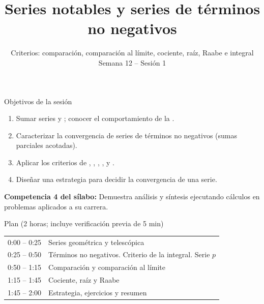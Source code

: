 \documentclass[10pt,aspectratio=169]{beamer}
\title[Series y criterios de convergencia]{Series notables y series de términos no negativos}
\subtitle{Criterios: comparación, comparación al límite, cociente, raíz, Raabe e integral\\[2pt]\small Semana 12 -- Sesión 1}
\begin{document}
\begin{frame}
  \titlepage
\end{frame}

\begin{frame}{Objetivos de la sesión}
  \begin{enumerate}
    \item Sumar series  y ; conocer el comportamiento de la .
    \item Caracterizar la convergencia de series de términos no negativos (sumas parciales acotadas).
    \item Aplicar los criterios de , , ,
      ,  y .
    \item Diseñar una estrategia para decidir la convergencia de una serie.
  \end{enumerate}
  \vspace{1mm}
  {\small\textbf{Competencia 4 del sílabo:} Demuestra análisis y síntesis ejecutando cálculos en problemas aplicados a su carrera.}
  \begin{block}{Plan (2 horas; incluye verificación previa de 5 min)}
    \begin{tabular}{ll}
      0:00 -- 0:25 & Series geométrica y telescópica\\
      0:25 -- 0:50 & Términos no negativos. Criterio de la integral. Serie $p$\\
      0:50 -- 1:15 & Comparación y comparación al límite\\
      1:15 -- 1:45 & Cociente, raíz y Raabe\\
      1:45 -- 2:00 & Estrategia, ejercicios y resumen
    \end{tabular}
  \end{block}
\end{frame}
\end{document}
